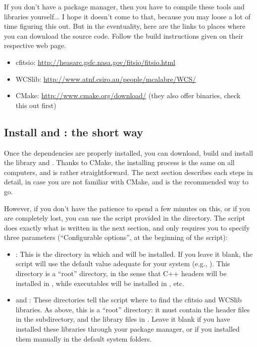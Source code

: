 If you don't have a package manager, then you have to compile these tools and libraries yourself... I hope it doesn't come to that, because you may loose a lot of time figuring this out. But in the eventuality, here are the links to places where you can download the source code. Follow the build instructions given on their respective web page.
\begin{itemize}
\item cfitsio: \url{http://heasarc.gsfc.nasa.gov/fitsio/fitsio.html}
\item WCSlib: \url{http://www.atnf.csiro.au/people/mcalabre/WCS/}
\item CMake: \url{http://www.cmake.org/download/} (they also offer binaries, check this out first)
\end{itemize}

\subsection{Install \vif and \egg: the short way}

Once the dependencies are properly installed, you can download, build and install the \vif library and \egg. Thanks to CMake, the installing process is the same on all computers, and is rather straightforward. The next section describes each steps in detail, in case you are not familiar with CMake, and is the recommended way to go.

However, if you don't have the patience to spend a few minutes on this, or if you are completely lost, you can use the  script provided in the  directory. The script does exactly what is written in the next section, and only requires you to specify three parameters (``Configurable options'', at the beginning of the script):
\begin{itemize}
\item {}: This is the directory in which \vif and \egg will be installed. If you leave it blank, the script will use the default value adequate for your system (e.g., ). This directory is a ``root'' directory, in the sense that C++ headers will be installed in , while executables will be installed in , etc.
\item {} and : These directories tell the script where to find the cfitsio and WCSlib libraries. As above, this is a ``root'' directory: it must contain the header files in the  subdirectory, and the library files in . Leave it blank if you have installed these libraries through your package manager, or if you installed them manually in the default system folders.
\end{itemize}

